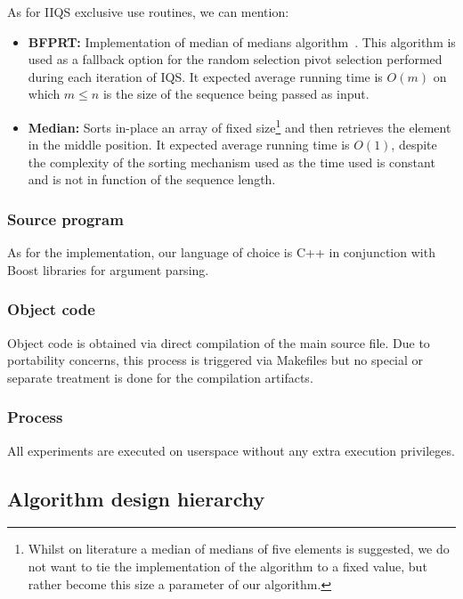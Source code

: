 As for IIQS exclusive use routines, we can mention:
\begin{itemize}
    \item \textbf{BFPRT:} Implementation of median of medians algorithm~\cite{Blum_Floyd_Pratt_Rivest_Tarjan_1973}. This algorithm is used as a fallback option for the random selection pivot selection performed during each iteration of IQS. It expected average running time is $O(m)$ on which $m \leq n$ is the size of the sequence being passed as input.
    \item \textbf{Median:} Sorts in-place an array of fixed size\footnote{Whilst on literature a median of medians of five elements is suggested, we do not want to tie the implementation of the algorithm to a fixed value, but rather become this size a parameter of our algorithm.} and then retrieves the element in the middle position. It expected average running time is $O(1)$, despite the complexity of the sorting mechanism used as the time used is constant and is not in function of the sequence length.
\end{itemize}

\subsubsection{Source program}
As for the implementation, our language of choice is C++ in conjunction with Boost libraries for argument parsing. \\

\subsubsection{Object code}
Object code is obtained via direct compilation of the main source file. Due to portability concerns, this process is triggered via Makefiles but no special or separate treatment is done for the compilation artifacts.\\

\subsubsection{Process}
All experiments are executed on userspace without any extra execution privileges.\\

\subsection{Algorithm design hierarchy}

